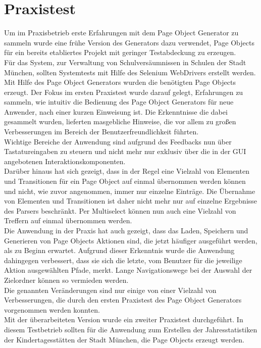 \section{Praxistest}
Um im Praxisbetrieb erste Erfahrungen mit dem Page Object Generator zu sammeln wurde eine frühe Version des Generators dazu verwendet, Page Objects für ein bereits etabliertes Projekt mit geringer Testabdeckung zu erzeugen.\\
Für das System, zur Verwaltung von Schulversäumnissen in Schulen der Stadt München, sollten Systemtests mit Hilfe des Selenium WebDrivers erstellt werden. Mit Hilfe des Page Object Generators wurden die benötigten Page Objects erzeugt. Der Fokus im ersten Praxistest wurde darauf gelegt, Erfahrungen zu sammeln, wie intuitiv die Bedienung des Page Object Generators für neue Anwender, nach einer kurzen Einweisung ist. Die Erkenntnisse die dabei gesammelt wurden, lieferten masgebliche Hinweise, die vor allem zu großen Verbesserungen im Bereich der Benutzerfreundlichkeit führten.\\
Wichtige Bereiche der Anwendung sind aufgrund des Feedbacks nun über Tastatureingaben zu steuern und nicht mehr nur exklusiv über die in der GUI angebotenen Interaktionskomponenten.\\
Darüber hinaus hat sich gezeigt, dass in der Regel eine Vielzahl von Elementen und Transitionen für ein Page Object auf einmal übernommen werden können und nicht, wie zuvor angenommen, immer nur einzelne Einträge. Die Übernahme von Elementen und Transitionen ist daher nicht mehr nur auf einzelne Ergebnisse des Parsers beschränkt. Per Multiselect können nun auch eine Vielzahl von Treffern auf einmal übernommen werden.\\
Die Anwendung in der Praxis hat auch gezeigt, dass das Laden, Speichern und Generieren von Page Objects Aktionen sind, die jetzt häufiger ausgeführt werden, als zu Beginn erwartet.
Aufgrund dieser Erkenntnis wurde die Anwendung dahingegen verbessert, dass sie sich die letzte, vom Benutzer für die jeweilige Aktion ausgewählten Pfade, merkt. Lange Navigationswege bei der Auswahl der Zielordner können so vermieden werden.\\
Die genannten Veränderungen sind nur einige von einer Vielzahl von Verbesserungen, die durch den ersten Praxistest des Page Object Generators vorgenommen werden konnten.\\
Mit der überarbeiteten Version wurde ein zweiter Praxistest durchgeführt. In diesem Testbetrieb sollten für die Anwendung zum Erstellen der Jahresstatistiken der Kindertagesstätten der Stadt München, die Page Objects erzeugt werden.
